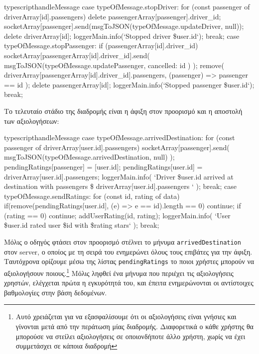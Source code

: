 \documentclass[../thesis.tex]{subfiles}
\begin{document}
\begin{codeblock}{typescript}{handleMessage}
  case typeOfMessage.stopDriver: {
    for (const passenger of driverArray[id].passengers){
      delete passengerArray[passenger].driver_id;
      socketArray[passenger].send(msgToJSON(typeOfMessage.updateDriver, null));
    }
    delete driverArray[id];
    loggerMain.info(`Stopped driver \${user.id}`);
    break;
  }
  case typeOfMessage.stopPassenger: {
    if (passengerArray[id].driver_id) {
      socketArray[passengerArray[id].driver_id].send(
        msgToJSON(typeOfMessage.updatePassenger, { cancelled: id })
      );
      remove(
        driverArray[passengerArray[id].driver_id].passengers,
        (passenger) => passenger == id
      );
    }
    delete passengerArray[id];
    loggerMain.info(`Stopped passenger \${user.id}`);
    break;
  }
\end{codeblock}

Το τελευταίο στάδιο της διαδρομής είναι η άφιξη στον προορισμό και η αποστολή των αξιολογήσεων: 

\begin{codeblock}{typescript}{handleMessage}
  case typeOfMessage.arrivedDestination: {
    for (const passenger of driverArray[user.id].passengers) {
      socketArray[passenger].send(
        msgToJSON(typeOfMessage.arrivedDestination, null)
      );
      pendingRatings[passenger] = [user.id];
    }
    pendingRatings[user.id] = driverArray[user.id].passengers;
    loggerMain.info(
      `Driver \${user.id} arrived at destination with passengers \${
        driverArray[user.id].passengers
      }`
    );
    break;
  }
  case typeOfMessage.sendRatings: {
    for (const {id, rating} of data) {
      if(remove(pendingRatings[user.id], (e) => e == id).length == 0) continue;
      if (rating == 0) continue;
      addUserRating(id, rating);
      loggerMain.info(
        `User \${user.id} rated user \${id} with \${rating} stars`
      );
    }
    break;
  }
\end{codeblock}

Μόλις ο οδηγός φτάσει στον προορισμό στέλνει το μήνυμα \verb|arrivedDestination| στον server, ο οποίος με τη σειρά του ενημερώνει όλους τους επιβάτες για την άφιξη.
Ταυτόχρονα ορίζουμε μέσω της λίστας \verb|pendingRatings| το ποιοι χρήστες μπορούν να αξιολογήσουν ποιους.\footnote{Αυτό χρειάζεται για να εξασφαλίσουμε ότι οι αξιολογήσεις είναι γνήσιες και γίνονται μετά από την περάτωση μίας διαδρομής. Διαφορετικά ο κάθε χρήστης θα μπορούσε να στείλει αξιολογήσεις σε οποιονδήποτε άλλο χρήστη, χωρίς να έχει συμμετάσχει σε κάποια διαδρομή}
Μόλις ληφθεί ένα μήνυμα που περιέχει τις αξιολογήσεις χρηστών, ελέγχεται πρώτα η εγκυρότητά του, και έπειτα ενημερώνονται οι αντίστοιχες βαθμολογίες στην βάση δεδομένων.
\end{document}
